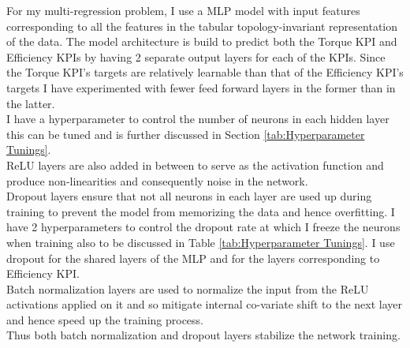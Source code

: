 \documentclass{report} %
\begin{document}
For my multi-regression problem, I use a \ac{MLP} model with input features corresponding to all the features in the tabular topology-invariant representation of the data.
The model architecture is build to predict both the Torque \ac{KPI} and Efficiency \ac{KPI}s by having 2 separate output layers for each of the \ac{KPI}s. 
Since the Torque \ac{KPI}'s targets are relatively learnable than that of the Efficiency \ac{KPI}'s targets I have experimented with fewer feed forward layers in the former than in the latter. \\
I have a hyperparameter to control the number of neurons in each hidden layer this can be tuned and is further discussed in Section \ref{tab:Hyperparameter Tunings}.\\
\ac{ReLU} layers are also added in between to serve as the activation function and produce non-linearities and consequently noise in the network. \\
Dropout layers ensure that not all neurons in each layer are used up during training to prevent the model from memorizing the data and hence overfitting.  
I have 2 hyperparameters to control the dropout rate at which I freeze the neurons when training also to be discussed in Table \ref{tab:Hyperparameter Tunings}.
I use dropout for the shared layers of the \ac{MLP} and for the layers corresponding to Efficiency \ac{KPI}.\\
Batch normalization layers are used to normalize the input from the \ac{ReLU} activations applied on it and so mitigate internal co-variate shift to the next layer and hence speed up the training process.\\
Thus both batch normalization and dropout layers stabilize the network training.\\
\end{document}
